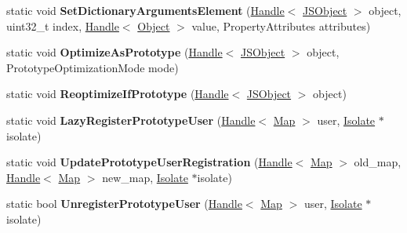 \begin{DoxyCompactItemize}
\item 
static void {\bfseries Set\+Dictionary\+Arguments\+Element} (\hyperlink{classv8_1_1internal_1_1_handle}{Handle}$<$ \hyperlink{classv8_1_1internal_1_1_j_s_object}{J\+S\+Object} $>$ object, uint32\+\_\+t index, \hyperlink{classv8_1_1internal_1_1_handle}{Handle}$<$ \hyperlink{classv8_1_1internal_1_1_object}{Object} $>$ value, Property\+Attributes attributes)\hypertarget{classv8_1_1internal_1_1_j_s_object_acf553b5cef4c5ce4285d1cf0754ad971}{}\label{classv8_1_1internal_1_1_j_s_object_acf553b5cef4c5ce4285d1cf0754ad971}

\item 
static void {\bfseries Optimize\+As\+Prototype} (\hyperlink{classv8_1_1internal_1_1_handle}{Handle}$<$ \hyperlink{classv8_1_1internal_1_1_j_s_object}{J\+S\+Object} $>$ object, Prototype\+Optimization\+Mode mode)\hypertarget{classv8_1_1internal_1_1_j_s_object_a76ec634f4df2b1f5b13ffd61ee7a695b}{}\label{classv8_1_1internal_1_1_j_s_object_a76ec634f4df2b1f5b13ffd61ee7a695b}

\item 
static void {\bfseries Reoptimize\+If\+Prototype} (\hyperlink{classv8_1_1internal_1_1_handle}{Handle}$<$ \hyperlink{classv8_1_1internal_1_1_j_s_object}{J\+S\+Object} $>$ object)\hypertarget{classv8_1_1internal_1_1_j_s_object_a342b5c9cabbf740064cf94830b92b330}{}\label{classv8_1_1internal_1_1_j_s_object_a342b5c9cabbf740064cf94830b92b330}

\item 
static void {\bfseries Lazy\+Register\+Prototype\+User} (\hyperlink{classv8_1_1internal_1_1_handle}{Handle}$<$ \hyperlink{classv8_1_1internal_1_1_map}{Map} $>$ user, \hyperlink{classv8_1_1internal_1_1_isolate}{Isolate} $\ast$isolate)\hypertarget{classv8_1_1internal_1_1_j_s_object_a149520fb4af4a58921f89c484ff42c37}{}\label{classv8_1_1internal_1_1_j_s_object_a149520fb4af4a58921f89c484ff42c37}

\item 
static void {\bfseries Update\+Prototype\+User\+Registration} (\hyperlink{classv8_1_1internal_1_1_handle}{Handle}$<$ \hyperlink{classv8_1_1internal_1_1_map}{Map} $>$ old\+\_\+map, \hyperlink{classv8_1_1internal_1_1_handle}{Handle}$<$ \hyperlink{classv8_1_1internal_1_1_map}{Map} $>$ new\+\_\+map, \hyperlink{classv8_1_1internal_1_1_isolate}{Isolate} $\ast$isolate)\hypertarget{classv8_1_1internal_1_1_j_s_object_a483a05c02334b9ac2bf7a5a392e4fe33}{}\label{classv8_1_1internal_1_1_j_s_object_a483a05c02334b9ac2bf7a5a392e4fe33}

\item 
static bool {\bfseries Unregister\+Prototype\+User} (\hyperlink{classv8_1_1internal_1_1_handle}{Handle}$<$ \hyperlink{classv8_1_1internal_1_1_map}{Map} $>$ user, \hyperlink{classv8_1_1internal_1_1_isolate}{Isolate} $\ast$isolate)\hypertarget{classv8_1_1internal_1_1_j_s_object_a6fc204aeda743e38eb48d8ccd3312db8}{}\label{classv8_1_1internal_1_1_j_s_object_a6fc204aeda743e38eb48d8ccd3312db8}


\end{DoxyCompactItemize}
